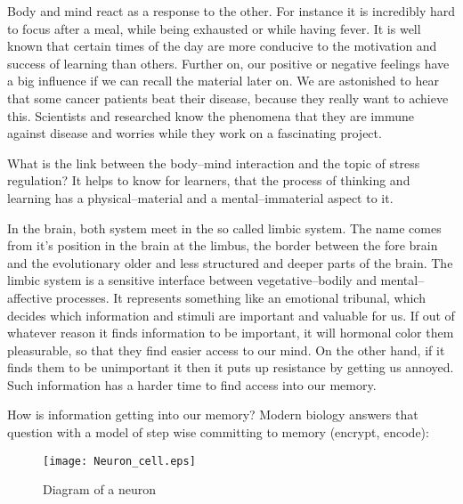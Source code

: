 \documentclass[../main.tex]{subfiles}
\begin{document}
Body and mind react as a response to the other.
For instance it is incredibly hard to focus after a meal, while being exhausted or while having fever.
It is well known that certain times of the day are more conducive to the motivation and success of learning than others.
Further on, our positive or negative feelings have a big influence if we can recall the material later on.
We are astonished to hear that some cancer patients beat their disease, because they really want to achieve this. Scientists and researched know the phenomena that they are immune against disease and worries while they work on a fascinating project.

What is the link between the body--mind interaction and the topic of stress regulation? It helps to know for learners, that the process of thinking and learning has a physical--material and a mental--immaterial aspect to it.

In the brain, both system meet in the so called limbic system.
The name comes from it's position in the brain at the limbus, the border between the fore brain and the evolutionary older and less structured and deeper parts of the brain.
The limbic system is a sensitive interface between vegetative--bodily and mental--affective processes. It represents something like an emotional tribunal, which decides which information and stimuli are important and valuable for us.
If out of whatever reason it finds information to be important, it will hormonal color them pleasurable, so that they find easier access to our mind.
On the other hand, if it finds them to be unimportant it then it puts up resistance by getting us annoyed. Such information has a harder time to find access into our memory.

How is information getting into our memory? Modern biology answers that question with a model of step wise committing to memory (encrypt, encode):

\begin{figure}[htb]
  \centering
  \texttt{[image: Neuron\_cell.eps]}
  \caption{Diagram of a neuron~\cite{wclipart}}
\end{figure}
\end{document}

